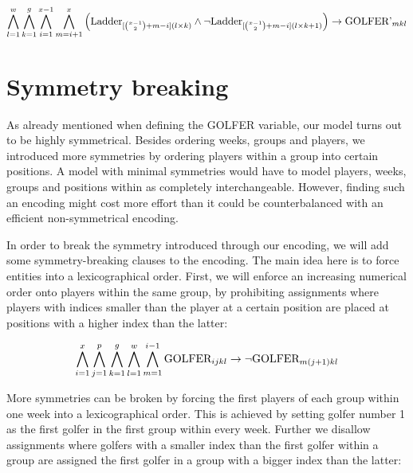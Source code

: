 \documentclass[a4paper]{scrartcl}
\begin{document}
\begin{equation}
\centering
    \bigwedge \limits_{l=1}^{w}
    \bigwedge \limits_{k=1}^{g}
    \bigwedge \limits_{i=1}^{x-1}
    \bigwedge \limits_{m=i+1}^{x}
    \Big(
        \text{Ladder}_{
            [
                {x-1 \choose 2}
                +m-i
            ](l \times k)
        }
        \wedge
        \neg
        \text{Ladder}_{
            [
                {x-1 \choose 2}
                +m-i
            ](l \times k + 1)
        }
    \Big)
    \to
    \text{GOLFER'}_{mkl}
\end{equation}

\section{Symmetry breaking}

As already mentioned when defining the GOLFER variable, our model turns out to be highly symmetrical. Besides ordering weeks, groups and players, we introduced more symmetries by ordering players within a group into certain positions. A model with minimal symmetries would have to model players, weeks, groups and positions within as completely interchangeable. However, finding such an encoding might cost more effort than it could be counterbalanced with an efficient non-symmetrical encoding. 

In order to break the symmetry introduced through our encoding, we will add some symmetry-breaking clauses to the encoding. The main idea here is to force entities into a lexicographical order. First, we will enforce an increasing numerical order onto players within the same group, by prohibiting assignments where players with indices smaller than the player at a certain position are placed at positions with a higher index than the latter:

\begin{equation}
\centering
    \bigwedge \limits_{i=1}^x
    \bigwedge \limits_{j=1}^p
    \bigwedge \limits_{k=1}^g
    \bigwedge \limits_{l=1}^w
    \bigwedge \limits_{m=1}^{i-1}
    \text{GOLFER}_{ijkl}
    \to
    \neg \text{GOLFER}_{m(j+1)kl}
\end{equation}

More symmetries can be broken by forcing the first players of each group within one week into a lexicographical order. This is achieved by setting golfer number 1 as the first golfer in the first group within every week. Further we disallow assignments where golfers with a smaller index than the first golfer within a group are assigned the first golfer in a group with a bigger index than the latter:
\end{document}
